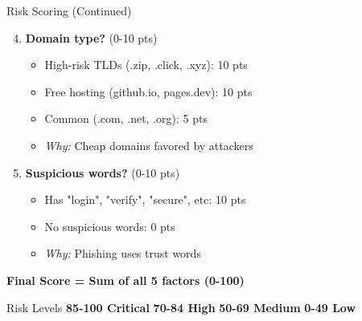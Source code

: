 \documentclass[aspectratio=169]{beamer}
\begin{document}
\begin{frame}{Risk Scoring (Continued)}
\small
\begin{enumerate}
    \setcounter{enumi}{3}
    
    \item \textbf{\textcolor{codeblue}{Domain type?}} (0-10 pts)
    \begin{itemize}
        \scriptsize
        \item High-risk TLDs (.zip, .click, .xyz): 10 pts
        \item Free hosting (github.io, pages.dev): 10 pts
        \item Common (.com, .net, .org): 5 pts
        \item \textit{Why:} Cheap domains favored by attackers
    \end{itemize}
    
    \item \textbf{\textcolor{lowgreen}{Suspicious words?}} (0-10 pts)
    \begin{itemize}
        \scriptsize
        \item Has "login", "verify", "secure", etc: 10 pts
        \item No suspicious words: 0 pts
        \item \textit{Why:} Phishing uses trust words
    \end{itemize}
\end{enumerate}

\vspace{0.3cm}
\textbf{Final Score = Sum of all 5 factors (0-100)}

\vspace{0.2cm}
\begin{block}{Risk Levels}
\small
\textcolor{criticalred}{\textbf{85-100 Critical}} \quad
\textcolor{highorange}{\textbf{70-84 High}} \quad
\textcolor{mediumyellow}{\textbf{50-69 Medium}} \quad
\textcolor{lowgreen}{\textbf{0-49 Low}}
\end{block}
\end{frame}
\end{document}
